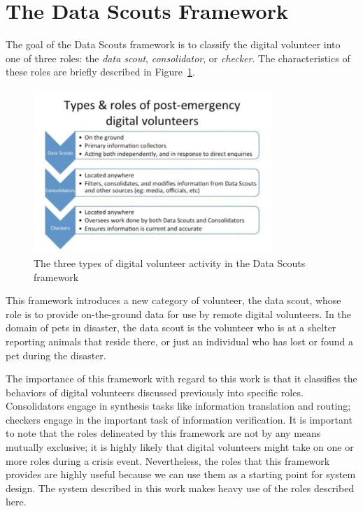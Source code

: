 \section {The Data Scouts Framework}

The goal of the Data Scouts framework \cite{sdc, palen:proposal} is to classify the digital volunteer into one of three roles: the {\em data scout}, {\em consolidator}, or {\em checker}.  The characteristics of these roles are briefly described in Figure~\ref{fig:datascouts}.

\begin{figure}[htbp]
    \begin{center}
	\includegraphics[width=90mm]{figs/datascouts.png}
    \end{center}
        \caption[Data Scouts Roles]{
        The three types of digital volunteer activity in the Data Scouts framework
	}
	 \label{fig:datascouts}
\end{figure}

This framework introduces a new category of volunteer, the data scout, whose role is to provide on-the-ground data for use by remote digital volunteers.  In the domain of pets in disaster, the data scout is the volunteer who is at a shelter reporting animals that reside there, or just an individual who has lost or found a pet during the disaster.

The importance of this framework with regard to this work is that it classifies the behaviors of digital volunteers discussed previously into specific roles.  Consolidators engage in synthesis tasks like information translation and routing; checkers engage in the important task of information verification.  It is important to note that the roles delineated by this framework are not by any means mutually exclusive; it is highly likely that digital volunteers might take on one or more roles during a crisis event.  Nevertheless, the roles that this framework provides are highly useful because we can use them as a starting point for system design.  The system described in this work makes heavy use of the roles described here.

